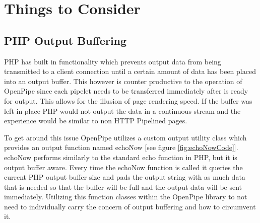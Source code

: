 \documentclass[12pt]{report}
\begin{document}
\chapter{Things to Consider}

\section{PHP Output Buffering}
PHP has built in functionality which prevents output data from being transmitted
to a client connection until a certain amount of data has been placed into an output buffer. This however is counter productive to the operation of OpenPipe since each pipelet needs to be transferred immediately after is ready for output. This allows for the illusion of page rendering speed. If the buffer was left in place PHP would not output the data in a continuous stream and the experience would be similar to non HTTP Pipelined pages. 

To get around this issue OpenPipe utilizes a custom output utility class which provides an output function named echoNow [see figure \ref{fig:echoNowCode}]. echoNow performs similarly to the standard echo function in PHP, but it is output buffer aware. Every time the echoNow function is called it queries the current PHP output buffer size and pads the output string with as much data that is needed so that the buffer will be full and the output data will be sent immediately. Utilizing this function classes within the OpenPipe library to not need to individually carry the concern of output buffering and how to circumvent it.
\end{document}
